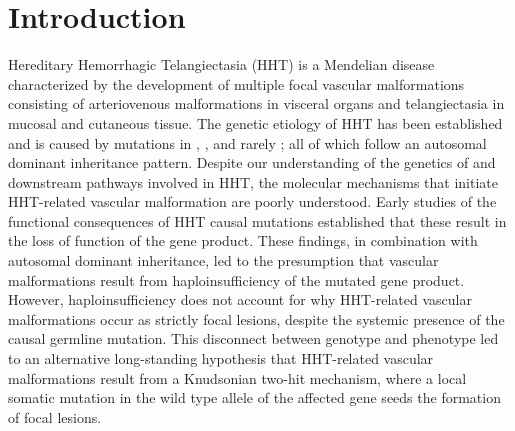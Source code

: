 \section{Introduction}
Hereditary Hemorrhagic Telangiectasia (HHT) is a Mendelian disease characterized by the development of multiple focal vascular malformations consisting of arteriovenous malformations in visceral organs and telangiectasia in mucosal and cutaneous tissue. The genetic etiology of HHT has been established and is caused by mutations in \citep{mcallister1994}, \citep{johnson1996}, and rarely \citep{gallione2004}; all of which follow an autosomal dominant inheritance pattern. Despite our understanding of the genetics of and downstream pathways involved in HHT, the molecular mechanisms that initiate HHT-related vascular malformation are poorly understood. Early studies of the functional consequences of HHT causal mutations established that these result in the loss of function of the gene product. These findings, in combination with autosomal dominant inheritance, led to the presumption that vascular malformations result from haploinsufficiency of the mutated gene product.\citep{pece1997, abdalla2000, ola2018} However, haploinsufficiency does not account for why HHT-related vascular malformations occur as strictly focal lesions, despite the systemic presence of the causal germline mutation. This disconnect between genotype and phenotype led to an alternative long-standing hypothesis that HHT-related vascular malformations result from a Knudsonian two-hit mechanism, where a local somatic mutation in the wild type allele of the affected gene seeds the formation of focal lesions.

